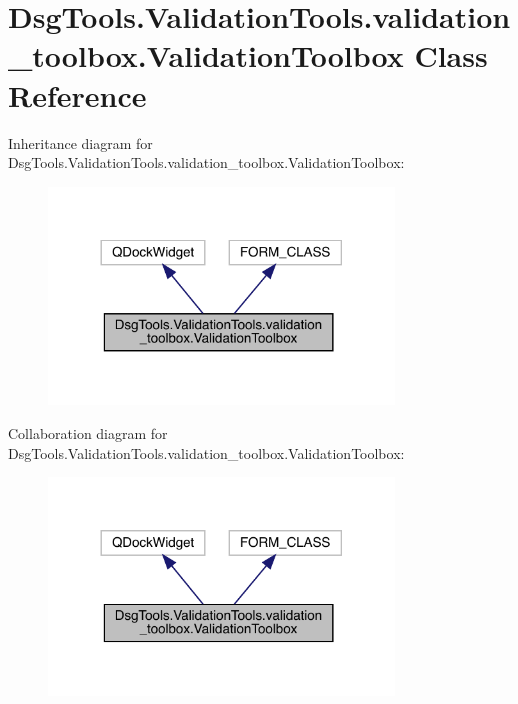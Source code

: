 \hypertarget{class_dsg_tools_1_1_validation_tools_1_1validation__toolbox_1_1_validation_toolbox}{}\section{Dsg\+Tools.\+Validation\+Tools.\+validation\+\_\+toolbox.\+Validation\+Toolbox Class Reference}
\label{class_dsg_tools_1_1_validation_tools_1_1validation__toolbox_1_1_validation_toolbox}


Inheritance diagram for Dsg\+Tools.\+Validation\+Tools.\+validation\+\_\+toolbox.\+Validation\+Toolbox\+:
\nopagebreak
\begin{figure}[H]
\begin{center}
\leavevmode
\includegraphics[width=260pt]{class_dsg_tools_1_1_validation_tools_1_1validation__toolbox_1_1_validation_toolbox__inherit__graph}
\end{center}
\end{figure}


Collaboration diagram for Dsg\+Tools.\+Validation\+Tools.\+validation\+\_\+toolbox.\+Validation\+Toolbox\+:
\nopagebreak
\begin{figure}[H]
\begin{center}
\leavevmode
\includegraphics[width=260pt]{class_dsg_tools_1_1_validation_tools_1_1validation__toolbox_1_1_validation_toolbox__coll__graph}
\end{center}
\end{figure}
